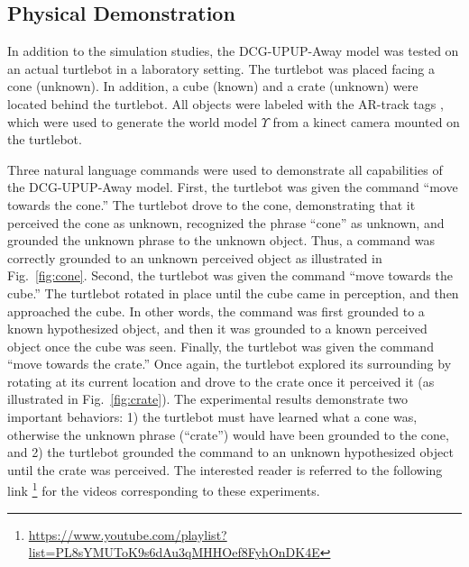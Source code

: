\subsection{Physical Demonstration}
In addition to the simulation studies, the DCG-UPUP-Away model was tested on an actual turtlebot in a laboratory setting.
The turtlebot was placed facing %
a cone (unknown).
In addition, a cube (known) and a crate (unknown) were located behind the turtlebot.
All objects were labeled with the AR-track tags \cite{olson2011}, which were used to generate the world model $\Upsilon$ from a kinect camera mounted on the turtlebot.

Three natural language commands were used to demonstrate all capabilities of the DCG-UPUP-Away model.
First, the turtlebot was given the command ``move towards the cone.''
The turtlebot drove to the cone, demonstrating that it perceived the cone as unknown, recognized the phrase ``cone'' as unknown, and grounded the unknown phrase to the unknown object.
Thus, a command was correctly grounded to an unknown perceived object as illustrated in Fig.~\ref{fig:cone}.
Second, the turtlebot was given the command ``move towards the cube.''
The turtlebot rotated in place until the cube came in perception, and then approached the cube.
In other words, the command was first grounded to a known hypothesized object, and then it was grounded to a known perceived object once the cube was seen. 
Finally, the turtlebot was given the command ``move towards the crate.''
Once again, the turtlebot explored its surrounding by rotating at its current location and drove to the crate once it perceived it (as illustrated in Fig.~\ref{fig:crate}). %
The experimental results demonstrate two important behaviors: 1) the turtlebot must have learned what a cone was, otherwise the unknown phrase (``crate'') would have been grounded to the cone, and 2) the turtlebot grounded the command to an unknown hypothesized object until the crate was perceived. The interested reader is referred to the following link \footnote{\url{https://www.youtube.com/playlist?list=PL8sYMUToK9s6dAu3qMHHOef8FyhOnDK4E}} for the videos corresponding to these experiments.

